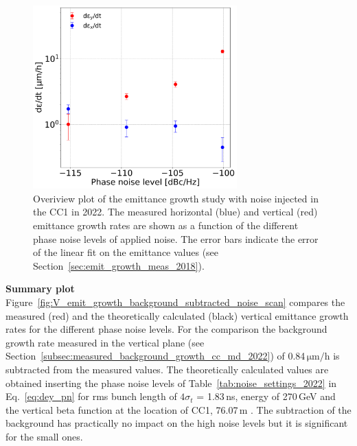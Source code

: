 \begin{figure}[!h] 
     \centering         
   \includegraphics[width=0.7\textwidth]{images/Ch8/emit_H_and_V_noise_scan.png}
       \caption{Overiview plot of the emittance growth study with noise injected in the CC1 in 2022. The measured horizontal (blue) and vertical (red) emittance growth rates are shown as a function of the different phase noise levels of applied noise. The error bars indicate the error of the linear fit on the emittance values (see Section~\ref{sec:emit_growth_meas_2018}).}
       \label{fig:H_V_emit_growth_noise_scan}
\end{figure}


\textbf{Summary plot}\\
Figure~\ref{fig:V_emit_growth_background_subtracted_noise_scan} compares the measured (red) and the theoretically calculated (black) vertical emittance growth rates for the different phase noise levels. For the comparison the background growth rate measured in the vertical plane (see Section~\ref{subsec:measured_background_growth_cc_md_2022}) of 0.84\,$\mathrm{\mu m /h}$ is subtracted from the measured values. The theoretically calculated values are obtained inserting the phase noise levels of Table~\ref{tab:noise_settings_2022} in Eq.~\eqref{eq:dey_pn} for rms bunch length of $4 \sigma_t$ = 1.83\,ns, energy of 270\,GeV and the vertical beta function at the location of CC1, 76.07\,m . The subtraction of the background has practically no impact on the high noise levels but it is significant for the small ones.

